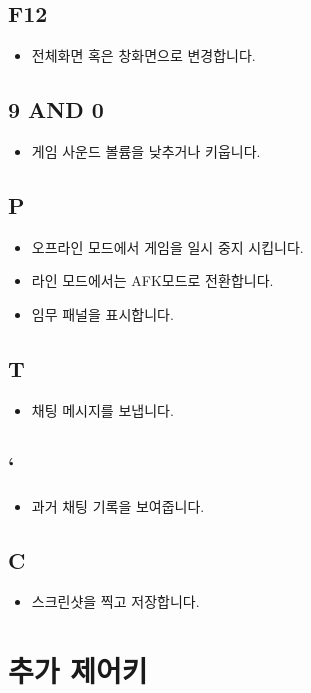 \documentclass{report}
\begin{document}
\begin{flushleft}
    \subsection{F12}
    \begin{itemize}
        \item 전체화면 혹은 창화면으로 변경합니다. 
    \end{itemize}
    \subsection{9 AND 0}
    \begin{itemize}
        \item 게임 사운드 볼륨을 낮추거나 키웁니다.
    \end{itemize}
    \subsection{P}
    \begin{itemize}
        \item 오프라인 모드에서 게임을 일시 중지 시킵니다.
        \item 라인 모드에서는 AFK모드로 전환합니다.
        \item 임무 패널을 표시합니다.
    \end{itemize}
    \subsection{T}
    \begin{itemize}
        \item 채팅 메시지를 보냅니다. 
    \end{itemize}
    \subsection{`}
    \begin{itemize}
        \item 과거 채팅 기록을 보여줍니다. 
    \end{itemize}
    \subsection{C}
    \begin{itemize}
        \item 스크린샷을 찍고 저장합니다. 
    \end{itemize}
    
    \section{추가 제어키}

\end{flushleft}
\end{document}
